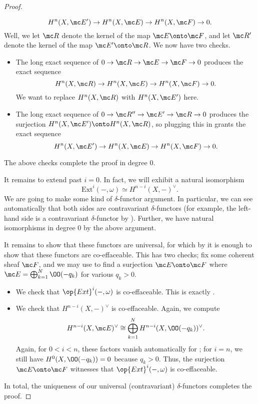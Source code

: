 \documentclass[../notes.tex]{subfiles}
\begin{document}
\begin{proof}
\begin{enumerate}
		\[H^n(X,\mc E')\to H^n(X,\mc E)\to H^n(X,\mc F)\to0.\]
		Well, we let $\mc R$ denote the kernel of the map $\mc E\onto\mc F$, and let $\mc R'$ denote the kernel of the map $\mc E'\onto\mc R$. We now have two checks.
		\begin{itemize}
			\item The long exact sequence of $0\to\mc R\to\mc E\to\mc F\to0$ produces the exact sequence
			\[H^n(X,\mc R)\to H^n(X,\mc E)\to H^n(X,\mc F)\to0.\]
			We want to replace $H^n(X,\mc R)$ with $H^n(X,\mc E')$ here.
			\item The long exact sequence of $0\to\mc R''\to\mc E'\to\mc R\to0$ produces the surjection $H^n(X,\mc E')\onto H^n(X,\mc R)$, so plugging this in grants the exact sequence
			\[H^n(X,\mc E')\to H^n(X,\mc E)\to H^n(X,\mc F)\to0.\]
		\end{itemize}
		The above checks complete the proof in degree $0$.
	\end{enumerate}
	It remains to extend past $i=0$. In fact, we will exhibit a natural isomorphism
	\[\mathrm{Ext}^i(-,\omega)\simeq H^{n-i}(X,-)^\lor.\]
	We are going to make some kind of $\delta$-functor argument. In particular, we can see automatically that both sides are contravariant $\delta$-functors (for example, the left-hand side is a contravariant $\delta$-functor by ). Further, we have natural isomorphisms in degree $0$ by the above argument.
	
	It remains to show that these functors are universal, for which by  it is enough to show that these functors are co-effaceable. This has two checks; fix some coherent sheaf $\mc F$, and we may use \cite[Corollary~II.5.18]{hartshorne} to find a surjection $\mc E\onto\mc F$ where $\mc E=\bigoplus_{k=1}^N\OO(-q_k)$ for various $q_k>0$.
	\begin{itemize}
		\item We check that $\op{Ext}^i(-,\omega)$ is co-effaceable. This is exactly .
		\item We check that $H^{n-i}(X,-)^\lor$ is co-effaceable. Again, we compute
		\[H^{n-i}(X,\mc E)^\lor\cong\bigoplus_{k=1}^NH^{n-i}(X,\OO(-q_k))^\lor.\]
		Again, for $0<i<n$, these factors vanish automatically for ; for $i=n$, we still have $H^0(X,\OO(-q_k))=0$ because $q_k>0$. Thus, the surjection $\mc E\onto\mc F$ witnesses that $\op{Ext}^i(-,\omega)$ is co-effaceable.
	\end{itemize}
	In total, the uniqueness of our universal (contravariant) $\delta$-functors completes the proof.
\end{proof}
\end{document}
